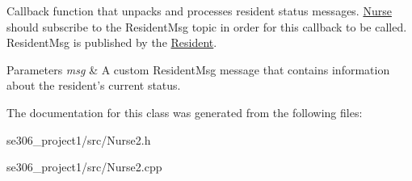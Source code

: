 Callback function that unpacks and processes resident status messages. \hyperlink{classNurse}{Nurse} should subscribe to the Resident\-Msg topic in order for this callback to be called. Resident\-Msg is published by the \hyperlink{classResident}{Resident}. 


\begin{DoxyParams}{Parameters}
{\em msg} & A custom Resident\-Msg message that contains information about the resident's current status. \\
\hline
\end{DoxyParams}


The documentation for this class was generated from the following files\-:\begin{DoxyCompactItemize}
\item 
se306\-\_\-project1/src/Nurse2.\-h\item 
se306\-\_\-project1/src/Nurse2.\-cpp\end{DoxyCompactItemize}
